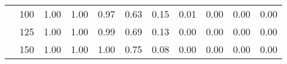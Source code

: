 \begin{table}[t]
\begin{center}
\begin{subtable}[c]{\textwidth}
\begin{center}
\begin{tabular}{rcccccccccc}
                                        & \multicolumn{1}{c|}{100}  & \num{1.00}  & \num{1.00}  & \num{0.97}  & \num{0.63}  & \num{0.15}  & \num{0.01}  & \num{0.00}  & \num{0.00}  & \num{0.00}  \\
                                        & \multicolumn{1}{c|}{125}  & \num{1.00}  & \num{1.00}  & \num{0.99}  & \num{0.69}  & \num{0.13}  & \num{0.00}  & \num{0.00}  & \num{0.00}  & \num{0.00}  \\
                                        & \multicolumn{1}{c|}{150}  & \num{1.00}  & \num{1.00}  & \num{1.00}  & \num{0.75}  & \num{0.08}  & \num{0.00}  & \num{0.00}  & \num{0.00}  & \num{0.00}  \\
                                    \end{tabular}
            \end{center}
        \end{subtable}

        \vspace{5mm}


\end{center}
\end{table}

